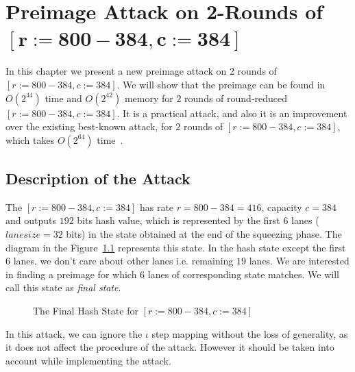 \chapter{Preimage Attack on 2-Rounds of \KECCAK{}$\mathbf{[r:=800-384, c:=384]}$}

In this chapter we present a new preimage attack on 2 rounds of \KECCAK{}$[r:=800-384, c:=384]$. We will show that the preimage can be found in $O(2^{44})$ time and $O(2^{42})$ memory for $2$ rounds of round-reduced \KECCAK{}$[r:=800-384, c:=384]$. It is a practical attack, and also it is an improvement over the existing best-known attack, for $2$ rounds of \KECCAK{}$[r:=800-384, c:=384]$, which takes $O(2^{64})$ time~\cite{guo2016linear}.

\section{Description of the Attack}
\label{2rkeccak800attack}
The \KECCAK{}$[r:=800-384, c:=384]$ has rate $r = 800-384 = 416$, capacity $c = 384$ and outputs $192$ bits hash value, which is represented by the first $6$ lanes ($lanesize = 32$ bits) in the state obtained at the end of the squeezing phase. The diagram in the Figure~\ref{initial_sq} represents this state. In the hash state except the first $6$ lanes, we don't care about other lanes i.e. remaining $19$ lanes. We are interested in finding a preimage for which $6$ lanes of corresponding state matches. We will call this state as \emph{final state}.
\begin{figure}[ht]
\begin{center}
\end{center}
\caption{The Final Hash State for \KECCAK{}$[r:=800-384, c:=384]$ \label{initial_sq}}
\end{figure}
In this attack, we can ignore the {$\iota$} step mapping without the loss of generality, as it does not affect the procedure of the attack. However it should be taken into account while implementing the attack.

